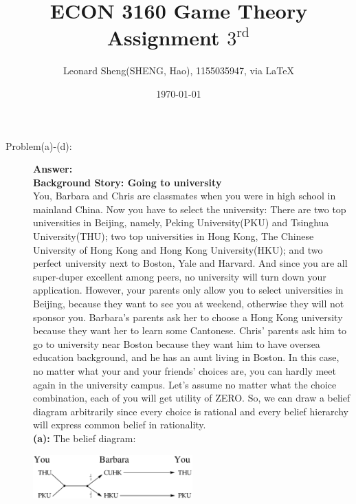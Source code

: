 \documentclass{article}
\begin{document}
\title{ECON 3160 Game Theory \\Assignment $3^{\text{rd}}$}
\author{{\normalsize Leonard Sheng(SHENG, Hao), 1155035947, via \LaTeX}}
\date{\today}

\maketitle

\def \Pr{{\rm Pr}}

\baselineskip 0.6cm
\begin{description}
    \item[Problem(a)-(d):]{\bf Answer:}\\
    {\bf Background Story: Going to university}\\
    You, Barbara and Chris are classmates when you were in high school in mainland China. Now you have to select the university: There are two top universities in Beijing, namely, Peking University(PKU) and Tsinghua University(THU); two top universities in Hong Kong, The Chinese University of Hong Kong and Hong Kong University(HKU); and two perfect university next to Boston, Yale and Harvard. And since you are all super-duper excellent among peers, no university will turn down your application. However, your parents only allow you to select universities in Beijing, because they want to see you at weekend, otherwise they will not sponsor you. Barbara's parents ask her to choose a Hong Kong university because they want her to learn some Cantonese. Chris' parents ask him to go to university near Boston because they want him to have oversea education background, and he has an aunt living in Boston. In this case, no matter what your and your friends' choices are, you can hardly meet again in the university campus. Let's assume no matter what the choice combination, each of you will get utility of ZERO. So, we can draw a belief diagram arbitrarily since every choice is rational and every belief hierarchy will express common belief in rationality.\\
    {\bf (a):}
    The belief diagram:
    \begin{center}
                    \includegraphics[angle=0, width=0.5\textwidth]{ECON3160A3P1}\\
    \end{center}

\end{description}
\end{document}
